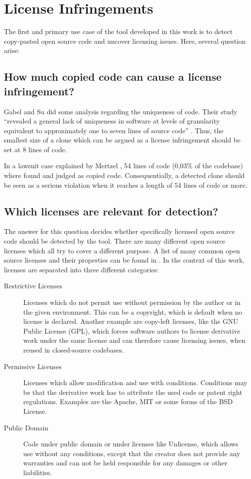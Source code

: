\section{License Infringements}\label{section:preliminaries/infringement}
The first and primary use case of the tool developed in this work is to detect copy-pasted open source code and uncover licensing issues.
Here, several question arise:

\subsection*{How much copied code can cause a license infringement?}\label{section:preliminaries/infringement/how_much_code}
Gabel and Su did some analysis regarding the uniqueness of code.
Their study \enquote{revealed a general lack of uniqueness in software at levels of granularity equivalent to approximately one to seven lines of source code} \cite{2010-gabel-su-source-code-uniqueness}.
Thus, the smallest size of a clone which can be argued as a license infringement should be set at 8 lines of code.

In a lawsuit case explained by Mertzel \cite{mertzel2008copying}, 54 lines of code (0,03\% of the codebase) where found and judged as copied code.
Consequentially, a detected clone should be seen as a serious violation when it reaches a length of 54 lines of code or more.

\subsection*{Which licenses are relevant for detection?}\label{section:preliminaries/infringement/relevant_licenses}
The answer for this question decides whether specifically licensed open source code should be detected by the tool.
There are many different open source licenses which all try to cover a different purpose.
A list of many common open source licenses and their properties can be found in \cite{licenses}.
In the context of this work, licenses are separated into three different categories:

\begin{description}
	\item[Restrictive Licenses] Licenses which do not permit use without permission by the author or in the given environment.
		This can be a copyright, which is default when no license is declared.
		Another example are copy-left licenses, like the GNU Public License (GPL), which forces software authors to license derivative work under the same license and can therefore cause licensing issues, when reused in closed-source codebases.
	\item[Permissive Licenses]
		Licenses which allow modification and use with conditions.
		Conditions may be that the derivative work has to attribute the used code or patent right regulations.
		Examples are the Apache, MIT or some forms of the BSD License.
	\item[Public Domain] 
		Code under public domain or under licenses like Unlicense, which allows use without any conditions, except that the creator does not provide any warranties and can not be held responsible for any damages or other liabilities.
\end{description}

